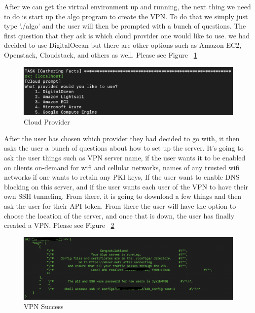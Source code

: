 After we can get the virtual environment up and running, the next thing we need to
do is start up the algo program to create the VPN. To do that
we simply just type './algo' and the user will then be prompted with a bunch of questions.
The first question that they ask is which cloud provider one would like to use. we had decided
to use DigitalOcean but there are other options such as Amazon EC2, Openstack, Cloudstack,
and others as well. Please see Figure ~\ref{fig:cloud provider}

\bigskip
\bigskip
\begin{figure}[hbt!]
\centering
\includegraphics[width=5in]{../images/provider-1.png}%
\caption{Cloud Provider}
\label{fig:cloud provider}
\end{figure}
\bigskip
\bigskip




After the user has chosen which provider they had decided to go with, it then asks the user
a bunch of questions about how to set up the server. It's going to ask the user things
such as VPN server name, if the user wants it to be enabled on clients on-demand for wifi and
cellular networks, names of any trusted wifi networks if one wants to retain any PKI keys,
If the user want to enable DNS blocking on this server, and if the user wants each user of the VPN to have their own
SSH tunneling. From there, it is going to download a few things and then ask the user for their API
token. From there the user will have the option to choose the location of the server, and once that
is down, the user has finally created a VPN. Please see Figure ~\ref{fig:vpn success}



\bigskip
\bigskip
\begin{figure}[hbt!]
\centering
\includegraphics[width=5in]{../images/algo-success1.png}%
\caption{VPN Success}
\label{fig:vpn success}
\end{figure}
\bigskip
\bigskip



